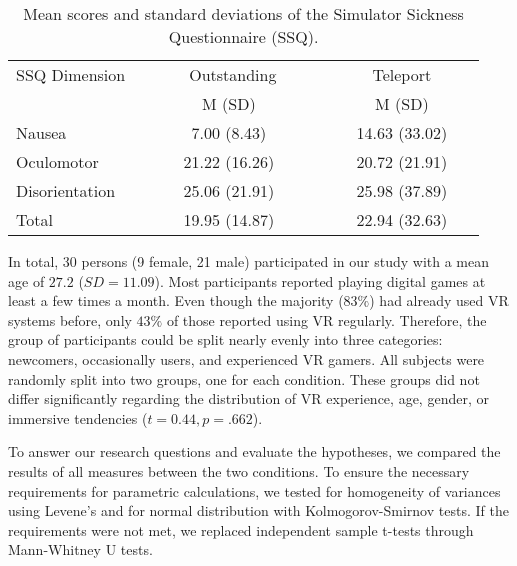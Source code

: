\documentclass{sigchi}
\begin{document}
\begin{table}
  \caption{Mean scores and standard deviations of the Simulator Sickness Questionnaire (SSQ).}
  \label{tab:SSQ}
  \begin{tabular}{lcc}
    \toprule
    SSQ Dimension & ~~~~~~Outstanding~~~~~ & ~~~~~Teleport~~~~~\\
     & M (SD)	& M (SD) \\
    \midrule
    Nausea & 7.00 (8.43) & 14.63 (33.02) \\
    Oculomotor & 21.22 (16.26) & 20.72 (21.91)\\
    Disorientation & 25.06 (21.91) & 25.98 (37.89)\\
    Total & 19.95 (14.87) & 22.94 (32.63)\\
  \bottomrule
\end{tabular}
\end{table}

In total, 30 persons (9 female, 21 male) participated in our study with a mean age of $27.2$ ($SD=11.09$). Most participants reported playing digital games at least a few times a month. Even though the majority ($83\%$) had already used VR systems before, only $43\%$ of those reported using VR regularly. Therefore, the group of participants could be split nearly evenly into three categories: newcomers, occasionally users, and experienced VR gamers. All subjects were randomly split into two groups, one for each condition. These groups did not differ significantly regarding the distribution of VR experience, age, gender, or immersive tendencies ($t=0.44, p=.662$).\par
To answer our research questions and evaluate the hypotheses, we compared the results of all measures between the two conditions. To ensure the necessary requirements for parametric calculations, we tested for homogeneity of variances using Levene's and for normal distribution with Kolmogorov-Smirnov tests. If the requirements were not met, we replaced independent sample t-tests through Mann-Whitney U tests.\par
\end{document}
